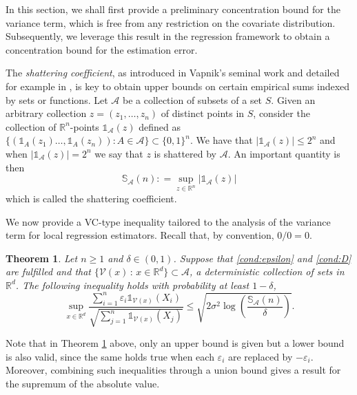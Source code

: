 \documentclass[paper=a4, fontsize=11pt]{scrartcl}
\newcommand{\ind}{\mathds{1}}
\newtheorem{theorem}{Theorem}
\begin{document}
In this section, we shall first provide a preliminary concentration bound for the variance term, which is free from any restriction on the covariate distribution. Subsequently, we leverage this result in the regression framework to obtain a concentration bound for the estimation error.



The \textit{shattering coefficient}, as introduced in Vapnik's seminal work \cite{vapnik2015uniform} and  detailed for example in \cite{wellner1996,devroye96probabilistic},
is key to obtain upper bounds on certain empirical sums indexed by sets or functions. Let $\mathcal A$ be a collection of subsets of a set $ S$. Given an arbitrary collection $z =( z_1,\ldots, z_n)$ of distinct points in $  S$, consider the collection of $\mathbb R^n$-points
$ \ind _ {\mathcal A} (z)$ defined as $  \{ (\ind _ A (z_1) \ldots, \ind_A (z_n )) : A\in \mathcal A \}\subset \{0,1\}^n $. 
We have that $|\ind _ {\mathcal A} (z)  | \leq 2^n$ and when $   |\ind _ {\mathcal A} (z) |  = 2^n$ we say that $z$ is shattered by $\mathcal A$. An important quantity is then
 $$\mathbb S_\mathcal A(n) : =  \sup_{z\in \mathbb R^n} | \ind _ {\mathcal A} (z) | $$
which is called the shattering coefficient. %

We now provide a VC-type inequality tailored to the analysis of the variance term for local regression estimators. Recall that, by convention, $0/0=0$.


\begin{theorem}\label{1}
Let $n\geq 1$ and $\delta \in (0,1) $. Suppose that \ref{cond:epsilon} and \ref{cond:D} are fulfilled and that $\{\mathcal V (x) \, :\, x\in \mathbb R^d\} \subset \mathcal A$, a deterministic collection of sets in $\mathbb R^d$. The following inequality holds with probability at least $1 - \delta$,
$$\sup_{x\in \mathbb R^d} \dfrac{\sum_{i=1}^n \varepsilon_i \mathds 1 _{ \mathcal V(x) }(X_i)}{\sqrt{\sum_{j=1}^n \mathds 1 _{ \mathcal V(x) }(X_j)}} \leq \sqrt{2 \sigma^2 \log\left( \frac{\mathbb S_ {  \mathcal A   } (n)}{\delta} \right)}.$$
\end{theorem}
Note that in Theorem \ref{1} above, only an upper bound is given but a lower bound is also valid, since the same holds true when each $\varepsilon _ i $ are replaced by $ -\varepsilon_i$. Moreover, combining such inequalities through a union bound gives a result for the supremum of the absolute value.
\end{document}
